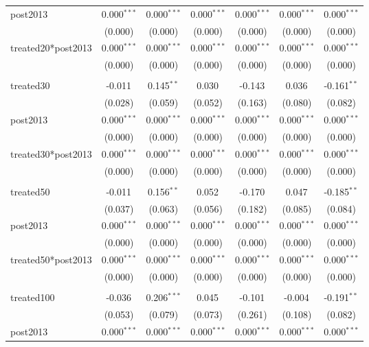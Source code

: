 \documentclass[12pt]{article}
\begin{document}
\begin{table}[!htbp]
\begin{tabular}{@{\extracolsep{5pt}}lcccccc}
 post2013 & 0.000$^{***}$ & 0.000$^{***}$ & 0.000$^{***}$ & 0.000$^{***}$ & 0.000$^{***}$ & 0.000$^{***}$ \\
  & (0.000) & (0.000) & (0.000) & (0.000) & (0.000) & (0.000) \\
 treated20*post2013 & 0.000$^{***}$ & 0.000$^{***}$ & 0.000$^{***}$ & 0.000$^{***}$ & 0.000$^{***}$ & 0.000$^{***}$ \\
  & (0.000) & (0.000) & (0.000) & (0.000) & (0.000) & (0.000) \\
\hline \\[-1.8ex]
 treated30 & -0.011$^{}$ & 0.145$^{**}$ & 0.030$^{}$ & -0.143$^{}$ & 0.036$^{}$ & -0.161$^{**}$ \\
  & (0.028) & (0.059) & (0.052) & (0.163) & (0.080) & (0.082) \\
 post2013 & 0.000$^{***}$ & 0.000$^{***}$ & 0.000$^{***}$ & 0.000$^{***}$ & 0.000$^{***}$ & 0.000$^{***}$ \\
  & (0.000) & (0.000) & (0.000) & (0.000) & (0.000) & (0.000) \\
 treated30*post2013 & 0.000$^{***}$ & 0.000$^{***}$ & 0.000$^{***}$ & 0.000$^{***}$ & 0.000$^{***}$ & 0.000$^{***}$ \\
  & (0.000) & (0.000) & (0.000) & (0.000) & (0.000) & (0.000) \\
\hline \\[-1.8ex]
 treated50 & -0.011$^{}$ & 0.156$^{**}$ & 0.052$^{}$ & -0.170$^{}$ & 0.047$^{}$ & -0.185$^{**}$ \\
  & (0.037) & (0.063) & (0.056) & (0.182) & (0.085) & (0.084) \\
 post2013 & 0.000$^{***}$ & 0.000$^{***}$ & 0.000$^{***}$ & 0.000$^{***}$ & 0.000$^{***}$ & 0.000$^{***}$ \\
  & (0.000) & (0.000) & (0.000) & (0.000) & (0.000) & (0.000) \\
 treated50*post2013 & 0.000$^{***}$ & 0.000$^{***}$ & 0.000$^{***}$ & 0.000$^{***}$ & 0.000$^{***}$ & 0.000$^{***}$ \\
  & (0.000) & (0.000) & (0.000) & (0.000) & (0.000) & (0.000) \\
\hline \\[-1.8ex]
 treated100 & -0.036$^{}$ & 0.206$^{***}$ & 0.045$^{}$ & -0.101$^{}$ & -0.004$^{}$ & -0.191$^{**}$ \\
  & (0.053) & (0.079) & (0.073) & (0.261) & (0.108) & (0.082) \\
 post2013 & 0.000$^{***}$ & 0.000$^{***}$ & 0.000$^{***}$ & 0.000$^{***}$ & 0.000$^{***}$ & 0.000$^{***}$ \\

\end{tabular}
\end{table}
\end{document}
